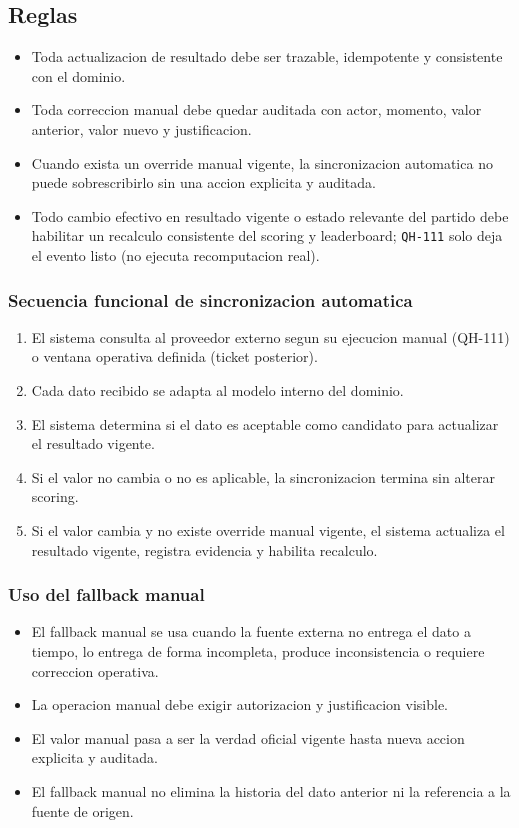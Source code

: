 \subsection{Reglas}

\begin{itemize}
  \item Toda actualizacion de resultado debe ser trazable, idempotente y consistente con el dominio.
  \item Toda correccion manual debe quedar auditada con actor, momento, valor anterior, valor nuevo y justificacion.
  \item Cuando exista un override manual vigente, la sincronizacion automatica no puede sobrescribirlo sin una accion explicita y auditada.
  \item Todo cambio efectivo en resultado vigente o estado relevante del partido debe habilitar un recalculo consistente del scoring y leaderboard; \texttt{QH-111} solo deja el evento listo (no ejecuta recomputacion real).
\end{itemize}

\subsubsection{Secuencia funcional de sincronizacion automatica}

\begin{enumerate}
  \item El sistema consulta al proveedor externo segun su ejecucion manual (QH-111) o ventana operativa definida (ticket posterior).
  \item Cada dato recibido se adapta al modelo interno del dominio.
  \item El sistema determina si el dato es aceptable como candidato para actualizar el resultado vigente.
  \item Si el valor no cambia o no es aplicable, la sincronizacion termina sin alterar scoring.
  \item Si el valor cambia y no existe override manual vigente, el sistema actualiza el resultado vigente, registra evidencia y habilita recalculo.
\end{enumerate}

\subsubsection{Uso del fallback manual}

\begin{itemize}
  \item El fallback manual se usa cuando la fuente externa no entrega el dato a tiempo, lo entrega de forma incompleta, produce inconsistencia o requiere correccion operativa.
  \item La operacion manual debe exigir autorizacion y justificacion visible.
  \item El valor manual pasa a ser la verdad oficial vigente hasta nueva accion explicita y auditada.
  \item El fallback manual no elimina la historia del dato anterior ni la referencia a la fuente de origen.
\end{itemize}

